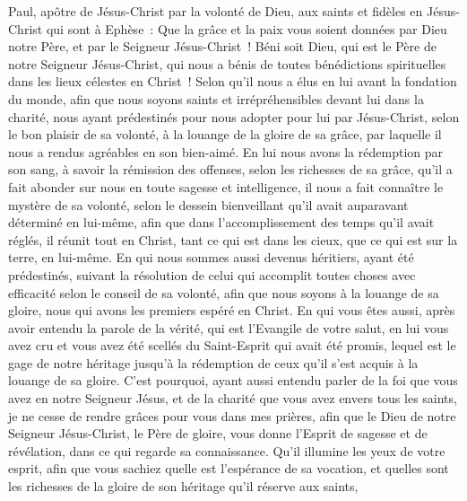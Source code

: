 \par\nobreak\noindent\hrulefill
\begin{multicols}{2}
\VerseOne{}Paul, apôtre de Jésus-Christ par la volonté de Dieu, aux saints et fidèles en Jésus-Christ qui sont à Ephèse~:
Que la grâce et la paix vous soient données par Dieu notre Père, et par le Seigneur Jésus-Christ~!
Béni soit Dieu, qui est le Père de notre Seigneur Jésus-Christ, qui nous a bénis de toutes bénédictions spirituelles dans les lieux célestes en Christ~!
Selon qu'il nous a élus en lui avant la fondation du monde, afin que nous soyons saints et irrépréhensibles devant lui dans la charité,
nous ayant prédestinés pour nous adopter pour lui par Jésus-Christ, selon le bon plaisir de sa volonté,
à la louange de la gloire de sa grâce, par laquelle il nous a rendus agréables en son bien-aimé.
En lui nous avons la rédemption par son sang, à savoir la rémission des offenses, selon les richesses de sa grâce,
qu'il a fait abonder sur nous en toute sagesse et intelligence,
il nous a fait connaître le mystère de sa volonté, selon le dessein bienveillant qu'il avait auparavant déterminé en lui-même,
afin que dans l'accomplissement des temps qu'il avait réglés, il réunit tout en Christ, tant ce qui est dans les cieux, que ce qui est sur la terre, en lui-même.
En qui nous sommes aussi devenus héritiers, ayant été prédestinés, suivant la résolution de celui qui accomplit toutes choses avec efficacité selon le conseil de sa volonté,
afin que nous soyons à la louange de sa gloire, nous qui avons les premiers espéré en Christ.
En qui vous êtes aussi, après avoir entendu la parole de la vérité, qui est l'Evangile de votre salut, en lui vous avez cru et vous avez été scellés du Saint-Esprit qui avait été promis,
lequel est le gage de notre héritage jusqu'à la rédemption de ceux qu'il s'est acquis à la louange de sa gloire.
C'est pourquoi, ayant aussi entendu parler de la foi que vous avez en notre Seigneur Jésus, et de la charité que vous avez envers tous les saints,
je ne cesse de rendre grâces pour vous dans mes prières,
afin que le Dieu de notre Seigneur Jésus-Christ, le Père de gloire, vous donne l'Esprit de sagesse et de révélation, dans ce qui regarde sa connaissance.
Qu'il illumine les yeux de votre esprit, afin que vous sachiez quelle est l'espérance de sa vocation, et quelles sont les richesses de la gloire de son héritage qu'il réserve aux saints,

\end{multicols}
